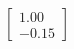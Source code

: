 \documentclass[preview]{standalone}
\begin{document}
\begin{align*}
\begin{bmatrix} 1.00 \\ -0.15 \end{bmatrix}
\end{align*}
\end{document}
